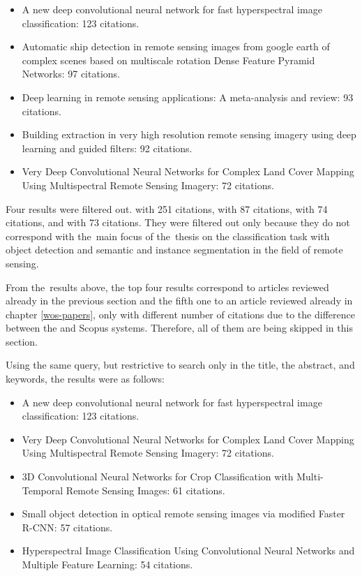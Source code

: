 \begin{itemize}
	\item A new deep convolutional neural network for fast hyperspectral image classification: 123 citations.  \cite{cnn-hs-class}
	\item Automatic ship detection in remote sensing images from google earth of complex scenes based on multiscale rotation Dense Feature Pyramid Networks: 97 citations. \cite{ship-rdfpn}
	\item Deep learning in remote sensing applications: A meta-analysis and review: 93 citations. \cite{dl-remote-sensing-review}
	\item Building extraction in very high resolution remote sensing imagery using deep learning and guided filters: 92 citations. \cite{res-u-net}
	\item Very Deep Convolutional Neural Networks for Complex Land Cover Mapping Using Multispectral Remote Sensing Imagery: 72 citations. \cite{very-deep-cnn-lc}
\end{itemize}

Four results were filtered out. \cite{dl-for-cv} with 251 citations, \cite{dl-lungs} with 87 citations, \cite{maoxian-landslide} with 74 citations, and \cite{state-of-the-art-dl} with 73 citations. They were filtered out only because they do not correspond with the~main focus of the~thesis on the classification task with object detection and semantic and instance segmentation in the field of remote sensing.

From the~results above, the top four results correspond to articles reviewed already in the previous section and the fifth one to an article reviewed already in chapter \ref{wos-papers}, only with different number of citations due to the difference between the  and Scopus systems. Therefore, all of them are being skipped in this section.

Using the same query, but restrictive to search only in the title, the abstract, and keywords, the results were as follows:

\begin{itemize}
	\item A new deep convolutional neural network for fast hyperspectral image classification: 123 citations.  \cite{cnn-hs-class}
	\item Very Deep Convolutional Neural Networks for Complex Land Cover Mapping Using Multispectral Remote Sensing Imagery: 72 citations. \cite{very-deep-cnn-lc}
	\item 3D Convolutional Neural Networks for Crop Classification with Multi-Temporal Remote Sensing Images: 61 citations. \cite{3d-cnn-crop}
	\item Small object detection in optical remote sensing images via modified Faster R-CNN: 57 citations. \cite{modified-faster-rcnn-small-objects}
	\item Hyperspectral Image Classification Using Convolutional Neural Networks and Multiple Feature Learning: 54 citations. \cite{hyperspectral-multiple-feat-cnn}
\end{itemize}

